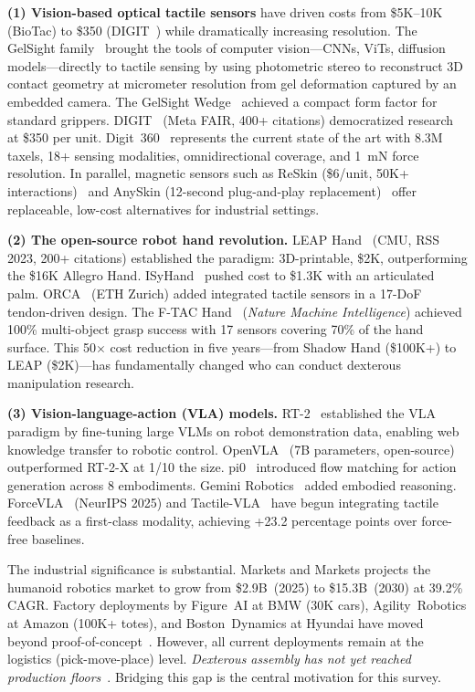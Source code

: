 \textbf{(1) Vision-based optical tactile sensors} have driven costs from \$5K--10K (BioTac) to \$350 (DIGIT~\cite{lambeta2020digit}) while dramatically increasing resolution. The GelSight family~\cite{yuan2017gelsight} brought the tools of computer vision---CNNs, ViTs, diffusion models---directly to tactile sensing by using photometric stereo to reconstruct 3D contact geometry at micrometer resolution from gel deformation captured by an embedded camera. The GelSight Wedge~\cite{wang2021wedge} achieved a compact form factor for standard grippers. DIGIT~\cite{lambeta2020digit} (Meta FAIR, 400+ citations) democratized research at \$350 per unit. Digit~360~\cite{lambeta2024digit360} represents the current state of the art with 8.3M taxels, 18+ sensing modalities, omnidirectional coverage, and 1~mN force resolution. In parallel, magnetic sensors such as ReSkin (\$6/unit, 50K+ interactions)~\cite{bhirangi2021reskin} and AnySkin (12-second plug-and-play replacement)~\cite{bhirangi2024anyskin} offer replaceable, low-cost alternatives for industrial settings.

\textbf{(2) The open-source robot hand revolution.} LEAP Hand~\cite{shaw2023leap} (CMU, RSS 2023, 200+ citations) established the paradigm: 3D-printable, \$2K, outperforming the \$16K Allegro Hand. ISyHand~\cite{richardson2025isyhand} pushed cost to \$1.3K with an articulated palm. ORCA~\cite{christoph2025orca} (ETH Zurich) added integrated tactile sensors in a 17-DoF tendon-driven design. The F-TAC Hand~\cite{zhao2025ftac} (\emph{Nature Machine Intelligence}) achieved 100\% multi-object grasp success with 17 sensors covering 70\% of the hand surface. This 50$\times$ cost reduction in five years---from Shadow Hand (\$100K+) to LEAP (\$2K)---has fundamentally changed who can conduct dexterous manipulation research.

\textbf{(3) Vision-language-action (VLA) models.} RT-2~\cite{brohan2023rt2} established the VLA paradigm by fine-tuning large VLMs on robot demonstration data, enabling web knowledge transfer to robotic control. OpenVLA~\cite{kim2024openvla} (7B parameters, open-source) outperformed RT-2-X at 1/10 the size. pi0~\cite{black2024pi0} introduced flow matching for action generation across 8 embodiments. Gemini Robotics~\cite{google2025gemini} added embodied reasoning. ForceVLA~\cite{yu2025forcevla} (NeurIPS 2025) and Tactile-VLA~\cite{huang2025tactilevla} have begun integrating tactile feedback as a first-class modality, achieving +23.2 percentage points over force-free baselines.

The industrial significance is substantial. Markets and Markets projects the humanoid robotics market to grow from \$2.9B~(2025) to \$15.3B~(2030) at 39.2\% CAGR. Factory deployments by Figure~AI at BMW (30K cars), Agility~Robotics at Amazon (100K+ totes), and Boston~Dynamics at Hyundai have moved beyond proof-of-concept~\cite{figureai2025}. However, all current deployments remain at the logistics (pick-move-place) level. \emph{Dexterous assembly has not yet reached production floors}~\cite{billard2019trends}. Bridging this gap is the central motivation for this survey.

